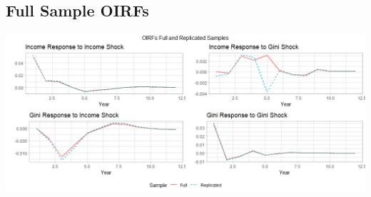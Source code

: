 \documentclass[11pt,preprint, authoryear]{elsarticle}
\let\origfigure\figure
\let\endorigfigure\endfigure
\renewenvironment{figure}[1][2] {
    \expandafter\origfigure\expandafter[H]
} {
    \endorigfigure
}
\numberwithin{equation}{section}
\numberwithin{figure}{section}
\numberwithin{table}{section}
\begin{document}
\hypertarget{full-sample-oirfs}{%
\subsection{\texorpdfstring{Full Sample OIRFs
\label{B}}{Full Sample OIRFs }}\label{full-sample-oirfs}}

\begin{figure}[H]
\includegraphics[width=1\linewidth]{images/Appendix_B_OIRFs_both_samples} \caption{\label{Fig6}}\label{fig:AppB}
\end{figure}


\end{document}
